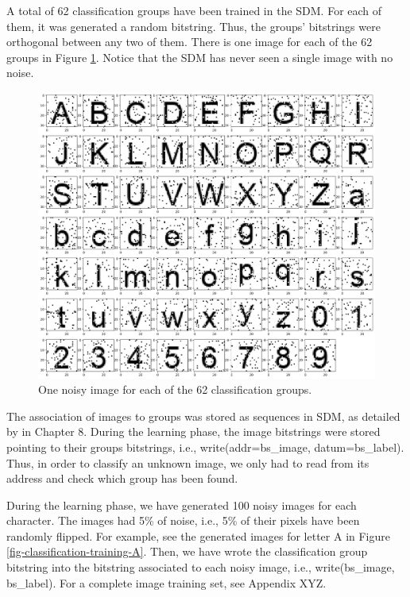 
A total of 62 classification groups have been trained in the SDM. For each of them, it was generated a random bitstring. Thus, the groups' bitstrings were orthogonal between any two of them. There is one image for each of the 62 groups in Figure \ref{fig-classification-groups}. Notice that the SDM has never seen a single image with no noise.

\begin{figure}[!htb]
\centering\includegraphics[width=\textwidth]{./images02/classification/groups.png}
\caption{One noisy image for each of the 62 classification groups.
\label{fig-classification-groups}}
\end{figure}

The association of images to groups was stored as sequences in SDM, as detailed by \citet{Kanerva1988} in Chapter 8. During the learning phase, the image bitstrings were stored pointing to their groups bitstrings, i.e., write(addr=bs\_image, datum=bs\_label). Thus, in order to classify an unknown image, we only had to read from its address and check which group has been found.


During the learning phase, we have generated 100 noisy images for each character. The images had 5\% of noise, i.e., 5\% of their pixels have been randomly flipped. For example, see the generated images for letter A in Figure \ref{fig-classification-training-A}. Then, we have wrote the classification group bitstring into the bitstring associated to each noisy image, i.e., write(bs\_image, bs\_label). For a complete image training set, see Appendix XYZ.

